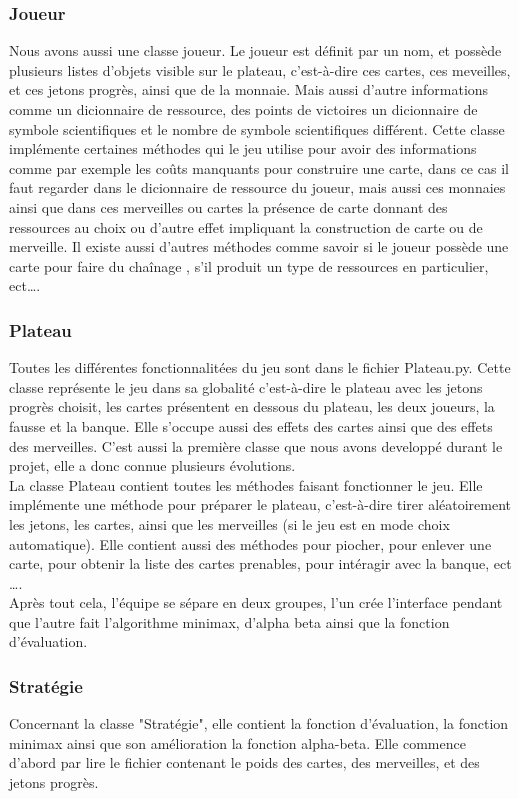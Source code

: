 \documentclass[12pt]{article}
\begin{document}
	\subsubsection{Joueur}
		Nous avons aussi une classe joueur. Le joueur est définit par un nom, et possède plusieurs listes d'objets visible sur le plateau, c'est-à-dire ces cartes, ces meveilles, et ces jetons progrès, ainsi  que de la monnaie. Mais aussi d'autre informations comme un dicionnaire de ressource, des points de victoires un dicionnaire de symbole scientifiques et le nombre de symbole scientifiques différent. Cette classe implémente certaines méthodes qui le jeu utilise pour avoir des informations comme par exemple les coûts manquants pour construire une carte, dans ce cas il faut regarder dans le dicionnaire de ressource du joueur, mais aussi ces monnaies ainsi que dans ces merveilles ou cartes la présence de carte donnant des ressources au choix ou d'autre effet impliquant la construction de carte ou de merveille. Il existe aussi d'autres méthodes comme savoir si le joueur possède une carte pour faire du chaînage , s'il produit un type de ressources en particulier, ect\ldots.

	\subsubsection{Plateau}
		Toutes les différentes fonctionnalitées du jeu sont dans le fichier Plateau.py. Cette classe
		représente le jeu dans sa globalité c'est-à-dire le plateau avec les jetons progrès choisit,
		les cartes présentent en dessous du plateau, les deux joueurs, la fausse et la banque.
		Elle s'occupe aussi des effets des cartes ainsi que des effets des merveilles.
		C'est aussi la première classe que nous avons developpé durant le projet, elle a donc connue
		plusieurs évolutions.\\
		La classe Plateau contient toutes les méthodes faisant fonctionner le jeu. Elle 
		implémente une méthode pour préparer le plateau, c'est-à-dire
		tirer aléatoirement les jetons, les cartes, ainsi que les merveilles (si le jeu
		est en mode choix automatique). Elle contient aussi des méthodes pour piocher, 
		pour enlever une carte, pour obtenir la liste des cartes prenables, pour intéragir
		avec la banque, ect \ldots.\\
		Après tout cela, l'équipe se sépare en deux groupes, l'un crée l'interface pendant que l'autre fait l'algorithme minimax, d'alpha beta ainsi que la fonction d'évaluation.

	\subsubsection{Stratégie}
		Concernant la classe "Stratégie", elle contient la fonction d'évaluation, la fonction
		minimax ainsi que son amélioration la fonction alpha-beta.
		Elle commence d'abord par lire le fichier contenant le poids des cartes, des merveilles, et des jetons progrès.
		
\end{document}
